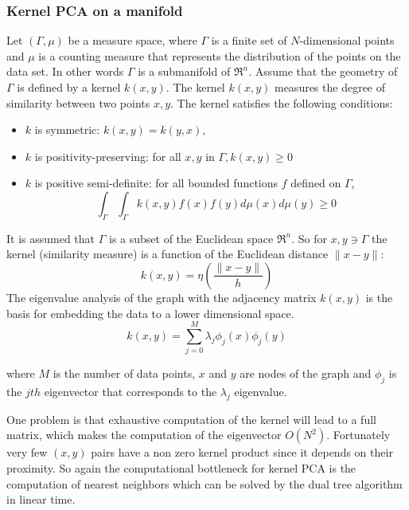 \documentclass[12pt,letterpaper,doublespaced,ETD,dvips,proposal]{gtthesis}
\begin{document}
\begin{Body}
\subsubsection{Kernel PCA on a manifold}
\label{Kernel_PCA_on_a_manifold}

Let  $(\Gamma,\mu)$ be a measure space, where $\Gamma$ is a finite
set of $N$-dimensional points and $\mu$ is a counting measure that
represents the distribution of the points on the data set. In other
words $\Gamma$ is a submanifold of $\Re^{n}$. Assume that the
geometry of $\Gamma$ is defined by a kernel $k(x,y)$. The kernel
$k(x,y)$ measures the degree of similarity between two points $x,y$.
The kernel satisfies the following conditions:
\begin{itemize}
    \item   $k$ is symmetric: $k(x,y)=k(y,x)$,
    \item   $k$ is positivity-preserving: for all $x,y$ in
$\Gamma, k(x,y)\geq 0$
    \item   $k$ is positive semi-definite: for all bounded
functions $f$ defined on  $\Gamma$,
\[
\int_{\Gamma} \int_{\Gamma} k(x,y)f(x)f(y)d\mu(x)d\mu(y)\geq 0\]
\end{itemize}
It is assumed that $\Gamma$ is a subset of the Euclidean space
$\Re^{n}$. So for $x,y\ni\Gamma$ the kernel (similarity measure) is
a function of the Euclidean distance $\parallel x-y\parallel:$
\[
 k(x,y)=\eta\left(\frac{\parallel x-y\parallel}{h}\right)
\]
The eigenvalue analysis of the graph with the adjacency matrix
$k(x,y)$ is the basis for embedding the data to a lower dimensional
space.
\[
    k(x,y)=\sum_{j=0}^{M} \lambda_{j}\phi_{j}(x)\phi_{j}(y)
\]

where $M$ is the number of data points, $x$ and $y$ are nodes of the
graph and $\phi_j$ is the $jth$ eigenvector that corresponds to the
$\lambda_j$ eigenvalue.

One problem is that exhaustive computation of the kernel will lead
to a full matrix, which makes the computation of the eigenvector
$O(N^2)$. Fortunately very few $(x,y)$ pairs have a non zero kernel
product since it depends on their proximity. So again the
computational bottleneck for kernel PCA is the computation of
nearest neighbors which can be solved by the dual tree algorithm in
linear time.


\end{Body}
\end{document}
